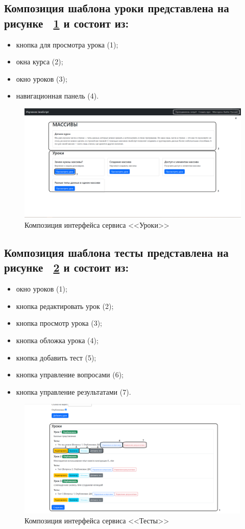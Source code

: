 \subsection*{Композиция шаблона уроки представлена на рисунке ~\ref{templ:image3} и состоит из:}

\begin{itemize}
	\item кнопка для просмотра урока (1);
	\item окна курса (2);
	\item окно уроков (3);
	\item навигационная панель (4).
\end{itemize}

\begin{figure}[htp!]
	\centering
	\includegraphics[width=0.8\linewidth]{images/уроки}
	\caption{Композиция интерфейса сервиса <<Уроки>>}
	\label{templ:image3}
\end{figure}

\subsection*{Композиция шаблона тесты представлена на рисунке ~\ref{templ:image4} и состоит из:}

\begin{itemize}
	\item окно уроков (1);
	\item кнопка редактировать урок (2);
	\item кнопка просмотр урока (3);
	\item кнопка обложка урока (4);
	\item кнопка добавить тест (5);
	\item кнопка управление вопросами (6);
	\item кнопка управление результатами (7).
\end{itemize}

\begin{figure}[htp!]
	\centering
	\includegraphics[width=0.8\linewidth]{images/Тесты}
	\caption{Композиция интерфейса сервиса <<Тесты>>}
	\label{templ:image4}
\end{figure}

